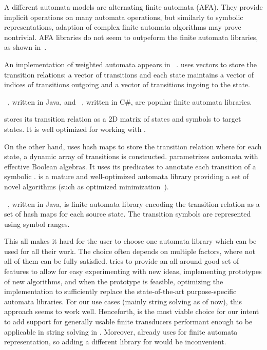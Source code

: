 A different automata models are alternating finite automata (AFA).
They provide implicit operations on many automata operations, but similarly to symbolic representations, adaption of complex finite automata algorithms may prove nontrivial.
AFA libraries do not seem to outpeform the finite automata libraries, as shown in~\cite{cade23_reasoning_regular_properties_comparision_DBLP:conf/cade/FiedorHHRSV23}.

An implementation of weighted automata appears in \awali~\cite{Awali}.
\awali uses vectors to store the transition relations: a vector of transitions and each state maintains a vector of indices of transitions outgoing and a vector of transitions ingoing to the state.

\automatajar~\cite{automatajar}, written in Java, and \automatanet~\cite{automatanet}, written in C\#, are popular finite automata libraries.

\automatajar stores its transition relation as a 2D matrix of states and symbols to target states.
It is well optimized for working with \dfas.

On the other hand, \automatanet uses hash maps to store the transition relation where for each state, a dynamic array of transitions is constructed.
\automatanet parametrizes automata with effective Boolean algebras.
It uses its predicates to annotate each transition of a symbolic \nfa.
\automatanet is a mature and well-optimized automata library providing a set of novel algorithms (such as optimized minimization~\cite{margus_minimization}).

\brics~\cite{brics}, written in Java, is finite automata library encoding the transition relation as a set of hash maps for each source state.
The transition symbols are represented using symbol ranges.

This all makes it hard for the user to choose one automata library which can be used for all their work.
The choice often depends on multiple factors, where not all of them can be fully satisfied.
\mata tries to provide an all-around good set of features to allow for easy experimenting with new ideas, implementing prototypes of new algorithms, and when the prototype is feasible, optimizing the implementation to sufficiently replace the state-of-the-art purpose-specific automata libraries.
For our use cases (mainly string solving as of now), this approach seems to work well.
Henceforth, \mata is the most viable choice for our intent to add support for generally usable finite transducers performant enough to be applicable in string solving in \noodler.
Moreover, \noodler already uses \mata for finite automata representation, so adding a different library for \nfts would be inconvenient.

